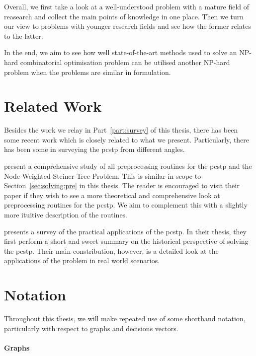\medskip\noindent
Overall, we first take a look at a well-understood problem with a mature field of reasearch and collect
the main points of knowledge in one place. Then we turn our view to problems with younger research fields
and see how the former relates to the latter.

In the end, we aim to see how well state-of-the-art methods used to solve an NP-hard combinatorial
optimisation problem can be utilised another NP-hard problem when the problems are similar in
formulation.

\section{Related Work}
Besides the work we relay in Part~\ref{part:survey} of this thesis,
there has been some recent work which is closely related
 to what we present. Particularly, there has been some in surveying the
\acrlong{pcstp} from different angles.

\citet*{rehfeldt2016reduction} present a comprehensive study of all preprocessing routines
for the \gls{pcstp} and the Node-Weighted Steiner Tree Problem. This is similar in scope to
Section~\ref{sec:solving:pre} in this thesis. The reader is encouraged to visit their paper
if they wish to see a more theoretical and comprehensive look at preprocessing routines for
the \gls{pcstp}. We aim to complement this with a slightly more ituitive description of the
routines.

\citet*{sun2018classical} presents a survey of the practical applications of the \gls{pcstp}.
In their thesis, they first perform a short and sweet summary on the historical perspective of
solving the \gls{pcstp}. Their main constribution, however,
is a detailed look at the applications
of the problem in real world scenarios.

\section{Notation}\label{sec:intro:notation}

Throughout this thesis, we will make repeated use of some shorthand notation, particularly
with respect to graphs and decisions vectors.

\paragraph{Graphs}

